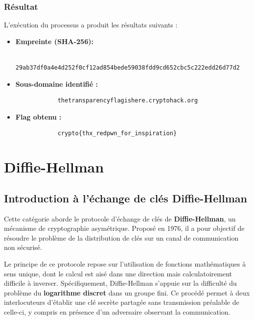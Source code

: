 \documentclass[12pt, a4paper]{article}
\begin{document}
        \subsubsection{Résultat}
            L'exécution du processus a produit les résultats suivants : 
            \begin{itemize} 
            \item \textbf{Empreinte (SHA-256):} 
            \begin{verbatim}
            29ab37df0a4e4d252f0cf12ad854bede59038fdd9cd652cbc5c222edd26d77d2
            \end{verbatim} 
            \item \textbf{Sous-domaine identifié :} 
            \begin{verbatim}
            thetransparencyflagishere.cryptohack.org
            \end{verbatim} 
            \item \textbf{Flag obtenu :} 
            \begin{verbatim}
            crypto{thx_redpwn_for_inspiration}
            \end{verbatim} 
            \end{itemize}


\section{Diffie-Hellman}
        \subsection{Introduction à l'échange de clés Diffie-Hellman}
        
        Cette catégorie aborde le protocole d'échange de clés de \textbf{Diffie-Hellman}, un mécanisme de cryptographie asymétrique. Proposé en 1976, il a pour objectif de résoudre le problème de la distribution de clés sur un canal de communication non sécurisé.
        
        Le principe de ce protocole repose sur l'utilisation de fonctions mathématiques à sens unique, dont le calcul est aisé dans une direction mais calculatoirement difficile à inverser. Spécifiquement, Diffie-Hellman s'appuie sur la difficulté du problème du \textbf{logarithme discret} dans un groupe fini. Ce procédé permet à deux interlocuteurs d'établir une clé secrète partagée sans transmission préalable de celle-ci, y compris en présence d'un adversaire observant la communication.
        
\end{document}
